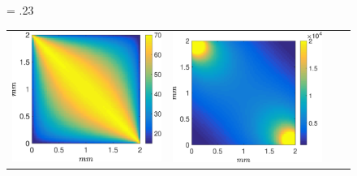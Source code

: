 \documentclass[aps,prb,article,groupedaddress,showkeys]{revtex4}
\begin{document}
\begin{figure}[h!tb]
	\centering
	\fwd = .23\textwidth
	\begin{tabular}{c c c c}
		\includegraphics[width=\fwd]{figs/E110_CBFOnDifferentResolutions_plot-Ps-scaleto-none-raw.eps} 
		& \includegraphics[width=\fwd]{figs/E110_CBFOnDifferentResolutions_plot-Pv-scaleto-none-raw.eps}

\end{tabular}
\end{figure}
\end{document}
